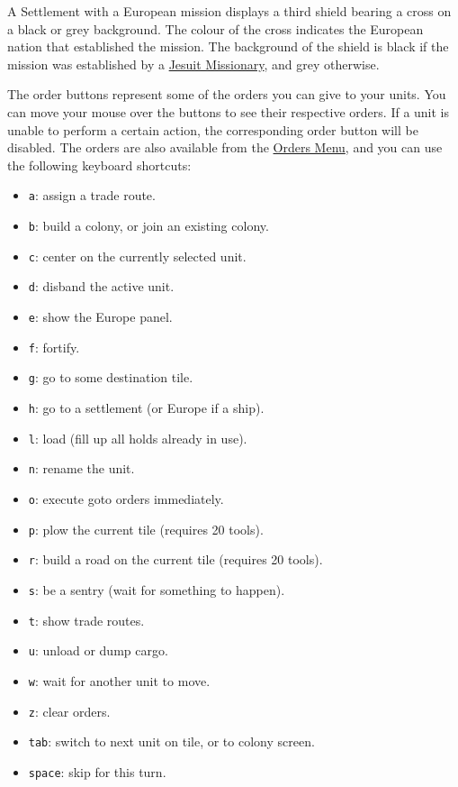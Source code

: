 \documentclass[12pt]{book}
\begin{document}
A Settlement with a European mission displays a third shield bearing a
cross on a black or grey background. The colour of the cross indicates
the European nation that established the mission. The background of
the shield is black if the mission was established by a
\hyperlink{Jesuit Missionary}{Jesuit Missionary}, and grey otherwise.

The order buttons represent some of the orders you can give to your
units. You can move your mouse over the buttons to see their
respective orders. If a unit is unable to perform a certain action,
the corresponding order button will be disabled. The orders are also
available from the \hyperlink{orders menu}{Orders Menu}, and you can
use the following \hypertarget{keyboard shortcuts}{keyboard shortcuts}:

\pagebreak[2]
\begin{itemize}
\item\verb$a$: assign a trade route.
\item\verb$b$: build a colony, or join an existing colony.
\item\verb$c$: center on the currently selected unit.
\item\verb$d$: disband the active unit.
\item\verb$e$: show the Europe panel.
\item\verb$f$: fortify.
\item\verb$g$: go to some destination tile.
\item\verb$h$: go to a settlement (or Europe if a ship).
\item\verb$l$: load (fill up all holds already in use).
\item\verb$n$: rename the unit.
\item\verb$o$: execute goto orders immediately.
\item\verb$p$: plow the current tile (requires 20 tools).
\item\verb$r$: build a road on the current tile (requires 20 tools).
\item\verb$s$: be a sentry (wait for something to happen).
\item\verb$t$: show trade routes.
\item\verb$u$: unload or dump cargo.
\item\verb$w$: wait for another unit to move.
\item\verb$z$: clear orders.
\item\verb$tab$: switch to next unit on tile, or to colony screen.
\item\verb$space$: skip for this turn.

\end{itemize}
\end{document}
